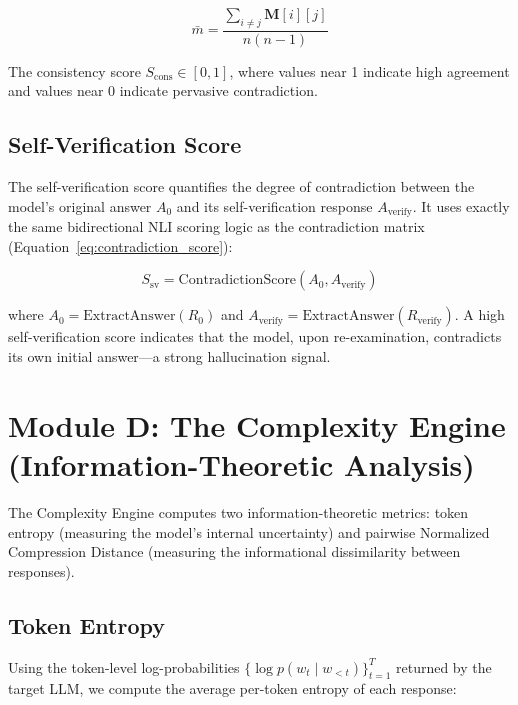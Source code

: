 \begin{equation}
    \bar{m} = \frac{\sum_{i \neq j} \mathbf{M}[i][j]}{n(n-1)}
\end{equation}

\noindent
The consistency score $S_{\text{cons}} \in [0, 1]$, where values near 1 indicate high agreement and values near 0 indicate pervasive contradiction.

\subsection{Self-Verification Score}
\label{sec:self_verify_score}

The self-verification score quantifies the degree of contradiction between the model's original answer $A_0$ and its self-verification response $A_{\text{verify}}$. It uses exactly the same bidirectional NLI scoring logic as the contradiction matrix (Equation~\ref{eq:contradiction_score}):

\begin{equation}
    S_{\text{sv}} = \text{ContradictionScore}(A_0, A_{\text{verify}})
\end{equation}

\noindent
where $A_0 = \text{ExtractAnswer}(R_0)$ and $A_{\text{verify}} = \text{ExtractAnswer}(R_{\text{verify}})$. A high self-verification score indicates that the model, upon re-examination, contradicts its own initial answer---a strong hallucination signal.


\section{Module D: The Complexity Engine (Information-Theoretic Analysis)}

The Complexity Engine computes two information-theoretic metrics: token entropy (measuring the model's internal uncertainty) and pairwise Normalized Compression Distance (measuring the informational dissimilarity between responses).

\subsection{Token Entropy}

Using the token-level log-probabilities $\{\log p(w_t \mid w_{<t})\}_{t=1}^{T}$ returned by the target LLM, we compute the average per-token entropy of each response:

